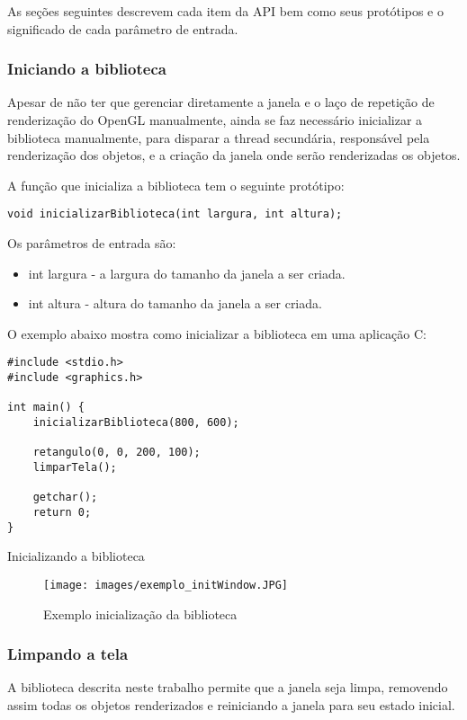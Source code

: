 \documentclass[12pt, %
openright,
oneside, %
a4paper,    %
brazil]{facom-ufu-abntex2}
\begin{document}
As seções seguintes descrevem cada item da API bem como seus protótipos e o significado de cada parâmetro de entrada.

\subsubsection{Iniciando a biblioteca}
Apesar de não ter que gerenciar diretamente a janela e o laço de repetição de renderização do OpenGL manualmente, ainda se faz necessário inicializar a biblioteca manualmente, para disparar a thread secundária, responsável pela renderização dos objetos, e a criação da janela onde serão renderizadas os objetos.

A função que inicializa a biblioteca tem o seguinte protótipo:

\begin{verbatim}
void inicializarBiblioteca(int largura, int altura);
\end{verbatim}

Os parâmetros de entrada são:

\begin{itemize}
    \item int largura - a largura do tamanho da janela a ser criada.
    \item int altura -  altura do tamanho da janela a ser criada.
\end{itemize}

O exemplo abaixo mostra como inicializar a biblioteca em uma aplicação C:
\begin{listing}[ht]
\begin{verbatim}
#include <stdio.h>
#include <graphics.h>

int main() {
    inicializarBiblioteca(800, 600);

    retangulo(0, 0, 200, 100);
    limparTela();

    getchar();
    return 0;
}
\end{verbatim}
\caption{Inicializando a biblioteca}
\label{lst:inicializando_biblioteca}
\end{listing}

\begin{figure}[!htbp]
  \centering
  \texttt{[image: images/exemplo\_initWindow.JPG]}
  \caption{Exemplo inicialização da biblioteca}
  \label{fig:exemplo_initWindow}
\end{figure}

\subsubsection{Limpando a tela}
A biblioteca descrita neste trabalho permite que a janela seja limpa, removendo assim todas os objetos renderizados e reiniciando a janela para seu estado inicial.
\end{document}
